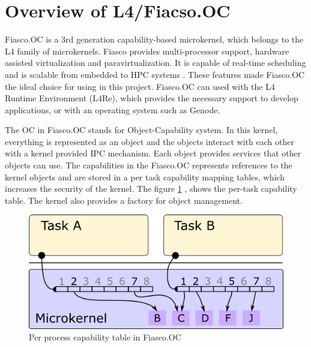 \section{Overview of L4/Fiacso.OC} \label{founcations:overfiasco}
Fiasco.OC is a 3rd generation capability-based microkernel, which belongs to the L4 family of microkernels. Fiasco provides multi-processor support, hardware assisted virtualization and paravirtualization. It is capable of real-time scheduling and is scalable from embedded to HPC systems \cite{foc_feat}. These features made Fiasco.OC the ideal choice for using in this project. Fiasco.OC can used with the L4 Runtime Environment (L4Re), which provides the necessary support to develop applications, or with an operating system such as Genode.

The OC in Fiasco.OC stands for Object-Capability system. In this kernel, everything is represented as an object and the objects interact with each other with a kernel provided IPC mechanism. Each object provides services that other objects can use. The capabilities in the Fiasco.OC represents references to the kernel objects and are stored in a per task capability mapping tables, which increases the security of the kernel. The figure \ref{fig:foc_cap} \cite{foc_pdf}, shows the per-task capability table. The kernel also provides a factory for object management.

\begin{figure}[h]
\centering
\includegraphics[width=0.7\linewidth]{figures/foc_cap.png}
\caption {Per process capability table in Fiasco.OC \cite{foc_pdf}}
\label{fig:foc_cap}
\end{figure}

